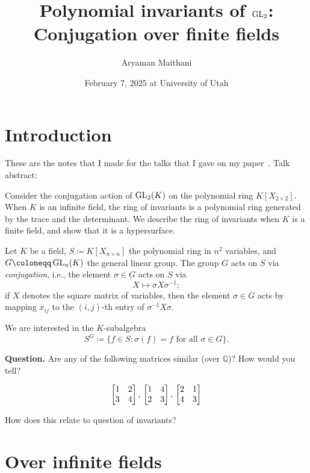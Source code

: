 \documentclass[12pt]{article}
\title{Polynomial invariants of \texorpdfstring{$\operatorname{GL}_{2}$}{GL(2)}: Conjugation over finite fields}
\author{Aryaman Maithani}
\date{February 7, 2025 at University of Utah}
\begin{document}
\maketitle

\section*{Introduction}

	These are the notes that I made for the talks that I gave on my paper~\Cite{Maithani:Conjugation}. Talk abstract: \newline

	\begin{blockquote}
		Consider the conjugation action of $\operatorname{GL}_{2}(K)$ on the polynomial ring $K[X_{2 \times 2}]$. 
		When $K$ is an infinite field, the ring of invariants is a polynomial ring generated by the trace and the determinant. 
		We describe the ring of invariants when $K$ is a finite field, and show that it is a hypersurface.
	\end{blockquote}

	Let $K$ be a field, $S \coloneqq K[X_{n \times n}]$ the polynomial ring in $n^{2}$ variables, and $G \coloneqq \GL_{n}(K)$ the general linear group. 
	The group $G$ acts on $S$ via \emph{conjugation}, i.e., the element $\sigma \in G$ acts on $S$ via
	\begin{equation*} 
		X \mapsto \sigma X \sigma^{-1};
	\end{equation*}
	if $X$ denotes the square matrix of variables, then the element $\sigma \in G$ acts by mapping $x_{ij}$ to the $(i, j)$-th entry of $\sigma^{-1} X \sigma$. 

	We are interested in the $K$-subalgebra
	\begin{equation*} 
		S^{G} \coloneqq \{f \in S : \sigma(f) = f \text{ for all } \sigma \in G\}.
	\end{equation*}

	\textbf{Question.} Are any of the following matrices similar (over $\mathbb{Q}$)? How would you tell?

	\begin{equation*} 
		\begin{bmatrix} 1 & 2 \\ 3 & 4 \end{bmatrix},\, \begin{bmatrix} 1 & 4 \\ 2 & 3 \end{bmatrix},\, \begin{bmatrix} 2 & 1 \\ 4 & 3 \end{bmatrix}
	\end{equation*}

	How does this relate to question of invariants? 

\section{Over infinite fields}
\end{document}
